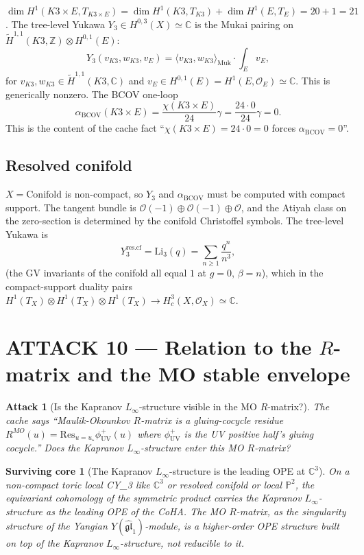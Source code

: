 \documentclass[11pt]{article}
\newtheorem{attack}[theorem]{Attack}
\newtheorem{surviving}[theorem]{Surviving core}
\providecommand{\BCOV}{\mathrm{BCOV}}
\providecommand{\cO}{\mathcal{O}}
\providecommand{\CC}{\mathbb{C}}
\providecommand{\ZZ}{\mathbb{Z}}
\begin{document}
$\dim H^1(K3 \times E, T_{K3\times E}) = \dim H^1(K3, T_{K3}) +
\dim H^1(E, T_E) = 20 + 1 = 21$. The tree-level Yukawa $Y_3 \in H^{0,3}(X)
\simeq \CC$ is the Mukai pairing on $\widetilde H^{1,1}(K3, \ZZ) \otimes
H^{0,1}(E)$:
\[
  Y_3(v_{K3}, w_{K3}, v_E) = \langle v_{K3}, w_{K3} \rangle_{\mathrm{Muk}}
    \cdot \int_E v_E,
\]
for $v_{K3}, w_{K3} \in \widetilde H^{1,1}(K3, \CC)$ and $v_E \in
H^{0,1}(E) = H^1(E, \cO_E) \simeq \CC$. This is generically nonzero.
The BCOV one-loop
\[
  \alpha_\BCOV(K3 \times E) = \frac{\chi(K3 \times E)}{24} \gamma =
    \frac{24 \cdot 0}{24} \gamma = 0.
\]
This is the content of the cache fact ``$\chi(K3 \times E) = 24 \cdot 0
= 0$ forces $\alpha_\BCOV = 0$''.

\subsection{Resolved conifold}

$X = \mathrm{Conifold}$ is non-compact, so $Y_3$ and $\alpha_\BCOV$ must
be computed with compact support. The tangent bundle is $\cO(-1) \oplus
\cO(-1) \oplus \cO$, and the Atiyah class on the zero-section is
determined by the conifold Christoffel symbols. The tree-level Yukawa is
\[
  Y_3^{\mathrm{res.cf}} = \mathrm{Li}_3(q) = \sum_{n \geq 1}
    \frac{q^n}{n^3},
\]
(the GV invariants of the conifold all equal $1$ at $g = 0$, $\beta =
n$), which in the compact-support duality pairs $H^1(T_X) \otimes H^1(T_X)
\otimes H^1(T_X) \to H^3_c(X, \cO_X) \simeq \CC$.

\section{ATTACK 10 --- Relation to the $R$-matrix and the MO stable envelope}
\label{sec:attack-10}

\begin{attack}[Is the Kapranov $L_\infty$-structure visible in the MO $R$-matrix?]
The cache says ``Maulik-Okounkov $R$-matrix is a gluing-cocycle residue
$R^{MO}(u) = \mathrm{Res}_{u = u_\star} \phi^+_\mathrm{UV}(u)$ where
$\phi^+_\mathrm{UV}$ is the UV positive half's gluing cocycle.'' Does
the Kapranov $L_\infty$-structure enter this MO $R$-matrix?
\end{attack}

\begin{surviving}[The Kapranov $L_\infty$-structure is the leading OPE
at $\mathbb C^3$]
\label{surv:10}
On a non-compact toric local CY_3 like $\mathbb C^3$ or resolved
conifold or local $\mathbb P^2$, the equivariant cohomology of the
symmetric product carries the Kapranov $L_\infty$-structure as the
leading OPE of the CoHA. The MO $R$-matrix, as the singularity structure
of the Yangian $Y(\widehat{\mathfrak{gl}}_1)$-module, is a higher-order
OPE structure built on top of the Kapranov $L_\infty$-structure, not
reducible to it.
\end{surviving}
\end{document}
